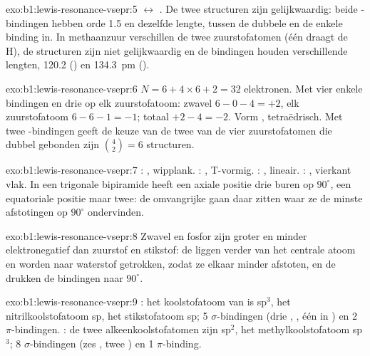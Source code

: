 \begin{solution}{exo:b1:lewis-resonance-vsepr:5}
$\leftrightarrow$
.
De twee structuren zijn gelijkwaardig: beide -bindingen hebben
orde 1.5 en dezelfde lengte, tussen de dubbele en de enkele binding in.
In methaanzuur verschillen de twee zuurstofatomen (één draagt de H), de
structuren zijn niet gelijkwaardig en de bindingen houden verschillende
lengten, 120.2 () en \qty{134.3}{pm} ().
\end{solution}

\begin{solution}{exo:b1:lewis-resonance-vsepr:6}
$N = 6 + 4 \times 6 + 2 = 32$ elektronen. Met vier enkele bindingen en
drie  op elk zuurstofatoom: zwavel $6 - 0 - 4 = +2$, elk
zuurstofatoom $6 - 6 - 1 = -1$; totaal $+2 - 4 = -2$. Vorm ,
tetraëdrisch. Met twee -bindingen geeft de keuze van de twee van
de vier zuurstofatomen die dubbel gebonden zijn $\binom{4}{2} = 6$
structuren.
\end{solution}

\begin{solution}{exo:b1:lewis-resonance-vsepr:7}
: , wipplank. : , T-vormig.
: , lineair. : , vierkant vlak. In
een trigonale bipiramide heeft een axiale positie drie buren op
$90^\circ$, een equatoriale positie maar twee: de omvangrijke 
gaan daar zitten waar ze de minste afstotingen op $90^\circ$ ondervinden.
\end{solution}

\begin{solution}{exo:b1:lewis-resonance-vsepr:8}
Zwavel en fosfor zijn groter en minder elektronegatief dan zuurstof en
stikstof: de  liggen verder van het centrale atoom en worden
naar waterstof getrokken, zodat ze elkaar minder afstoten, en de  drukken de bindingen naar $90^\circ$.
\end{solution}

\begin{solution}{exo:b1:lewis-resonance-vsepr:9}
: het koolstofatoom van  is sp$^3$, het
nitrilkoolstofatoom sp, het stikstofatoom sp; 5 $\sigma$-bindingen (drie
, , één in ) en 2 $\pi$-bindingen.
: de twee alkeenkoolstofatomen zijn sp$^2$, het
methylkoolstofatoom sp$^3$; 8 $\sigma$-bindingen (zes , twee
) en 1 $\pi$-binding.
\end{solution}

